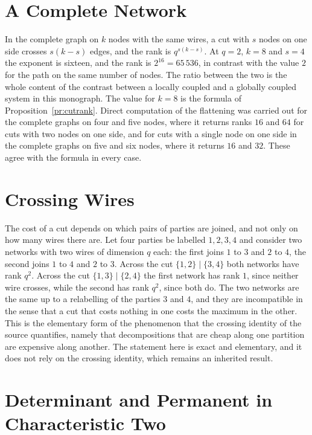 \documentclass[11pt,letterpaper]{report}
\theoremstyle{plain}
\theoremstyle{definition}
\theoremstyle{remark}
\begin{document}
\section{A Complete Network}

In the complete graph on $k$ nodes with the same wires, a cut with $s$ nodes on one side crosses $s(k-s)$ edges, and the rank is $q^{s(k-s)}$. At $q=2$, $k=8$ and $s=4$ the exponent is sixteen, and the rank is $2^{16}=65\,536$, in contrast with the value $2$ for the path on the same number of nodes. The ratio between the two is the whole content of the contrast between a locally coupled and a globally coupled system in this monograph. The value for $k=8$ is the formula of Proposition~\ref{pr:cutrank}. Direct computation of the flattening was carried out for the complete graphs on four and five nodes, where it returns ranks $16$ and $64$ for cuts with two nodes on one side, and for cuts with a single node on one side in the complete graphs on five and six nodes, where it returns $16$ and $32$. These agree with the formula in every case.

\section{Crossing Wires}

The cost of a cut depends on which pairs of parties are joined, and not only on how many wires there are. Let four parties be labelled $1,2,3,4$ and consider two networks with two wires of dimension $q$ each: the first joins $1$ to $3$ and $2$ to $4$, the second joins $1$ to $4$ and $2$ to $3$. Across the cut $\{1,2\}\mid\{3,4\}$ both networks have rank $q^2$. Across the cut $\{1,3\}\mid\{2,4\}$ the first network has rank $1$, since neither wire crosses, while the second has rank $q^2$, since both do. The two networks are the same up to a relabelling of the parties $3$ and $4$, and they are incompatible in the sense that a cut that costs nothing in one costs the maximum in the other. This is the elementary form of the phenomenon that the crossing identity of the source quantifies, namely that decompositions that are cheap along one partition are expensive along another. The statement here is exact and elementary, and it does not rely on the crossing identity, which remains an inherited result.

\section{Determinant and Permanent in Characteristic Two}
\end{document}
